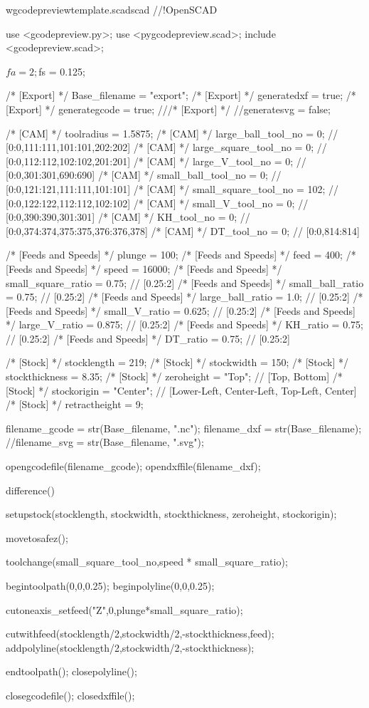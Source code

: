 \documentclass{ltxdoc}
\begin{document}
\lstset{firstnumber=1}%
\begin{writecode}{w}{gcodepreviewtemplate.scad}{scad}
//!OpenSCAD

use <gcodepreview.py>;
use <pygcodepreview.scad>;
include <gcodepreview.scad>;

$fa = 2;
$fs = 0.125;

/* [Export] */
Base_filename = "export"; 
/* [Export] */
generatedxf = true; 
/* [Export] */
generategcode = true; 
///* [Export] */
//generatesvg = false; 

/* [CAM] */
toolradius = 1.5875;
/* [CAM] */
large_ball_tool_no = 0; // [0:0,111:111,101:101,202:202]
/* [CAM] */
large_square_tool_no = 0; // [0:0,112:112,102:102,201:201]
/* [CAM] */
large_V_tool_no = 0; // [0:0,301:301,690:690]
/* [CAM] */
small_ball_tool_no = 0; // [0:0,121:121,111:111,101:101]
/* [CAM] */
small_square_tool_no = 102; // [0:0,122:122,112:112,102:102]
/* [CAM] */
small_V_tool_no = 0; // [0:0,390:390,301:301]
/* [CAM] */
KH_tool_no = 0; // [0:0,374:374,375:375,376:376,378]
/* [CAM] */
DT_tool_no = 0; // [0:0,814:814]

/* [Feeds and Speeds] */
plunge = 100;
/* [Feeds and Speeds] */
feed = 400;
/* [Feeds and Speeds] */
speed = 16000;
/* [Feeds and Speeds] */
small_square_ratio = 0.75; // [0.25:2]
/* [Feeds and Speeds] */
small_ball_ratio = 0.75; // [0.25:2]
/* [Feeds and Speeds] */
large_ball_ratio = 1.0; // [0.25:2]
/* [Feeds and Speeds] */
small_V_ratio = 0.625; // [0.25:2]
/* [Feeds and Speeds] */
large_V_ratio = 0.875; // [0.25:2]
/* [Feeds and Speeds] */
KH_ratio = 0.75; // [0.25:2]
/* [Feeds and Speeds] */
DT_ratio = 0.75; // [0.25:2]

/* [Stock] */
stocklength = 219;
/* [Stock] */
stockwidth = 150;
/* [Stock] */
stockthickness = 8.35;
/* [Stock] */
zeroheight = "Top"; // [Top, Bottom]
/* [Stock] */
stockorigin = "Center"; // [Lower-Left, Center-Left, Top-Left, Center]
/* [Stock] */
retractheight = 9;

filename_gcode = str(Base_filename, ".nc");
filename_dxf = str(Base_filename);
//filename_svg = str(Base_filename, ".svg");

opengcodefile(filename_gcode);
opendxffile(filename_dxf);

difference() {
setupstock(stocklength, stockwidth, stockthickness, zeroheight, stockorigin);

movetosafez();

toolchange(small_square_tool_no,speed * small_square_ratio);

begintoolpath(0,0,0.25);
beginpolyline(0,0,0.25);

cutoneaxis_setfeed("Z",0,plunge*small_square_ratio);

cutwithfeed(stocklength/2,stockwidth/2,-stockthickness,feed);
addpolyline(stocklength/2,stockwidth/2,-stockthickness);

endtoolpath();
closepolyline();
}

closegcodefile();
closedxffile();
\end{writecode}
\addtocounter{gcptmpl}{99}
\end{document}
